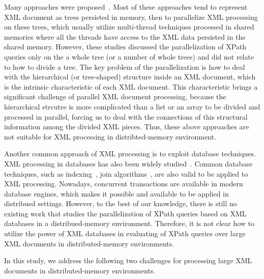 Many approaches were proposed~\cite{JLWO03, SAFu05,NEMH07,BuLM08,Mats09,
ZhPC10,ChLW13,HaMa16}. Most of these approaches tend to represent XML document
as trees persisted in memory, then to parallelize XML processing on these trees,
which usually utilize multi-thread techniques processed in shared memories where
all the threads  have access to the XML data persisted in the shared memory.
However, these studies discussed the parallelization of XPath queries only on
the a whole tree (or a number of whole trees) and did not relate to how to
divide a tree. The key problem of the parallelization is how to deal with the
hierarchical (or tree-shaped) structure inside an XML document, which is the
intrinsic characteristic of each XML document.  This characteristic brings a
significant challenge of parallel XML document processing, because the
hierarchical strcutre is more complicated than a list or an array to be divided
and processed in parallel, forcing us to deal with the connections of this
structural information among the divided XML pieces. Thus, these above
approaches are not suitable for XML processing in  distribted-memory
environment.

Another common approach of XML processing is to exploit database techniques. XML
processing in databases has also been widely studied~\cite{fong2001converting,
meier2002exist, jagadish2002timber,jiang2002xparent,PCSS04}. Common database
techniques, such as indexing~\cite{kha2001xml, wang2005sequencing,
popovici2005sirius}, join algorithms~\cite{liang2005lax,liang2006slax,
guha2003index}, are also valid to be applied to XML processing. Nowadays,
concurrent transactions are available in modern database engines, which makes it
possible and available to be applied in distribued settings. However, to the
best of our knowledge, there is still no existing work that studies the
parallelization of XPath queries based on XML databases in a distribued-memory
environment. Therefore, it is not clear how to utilize the power of XML
databases in evaluating of XPath queries over large XML documents in
distributed-memory environments.

In this study, we address the following two challenges for processing large
XML documents in distributed-memory environments.

